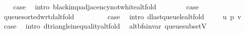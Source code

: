 \begin{isabellebody}
\ \ \isamarkupfalse%
\ {\isacharquery}{\kern0pt}case\ \isamarkupfalse%
\ {\isacharparenleft}{\kern0pt}intro\ black{\isacharunderscore}{\kern0pt}imp{\isacharunderscore}{\kern0pt}adjacency{\isacharunderscore}{\kern0pt}not{\isacharunderscore}{\kern0pt}white{\isacharunderscore}{\kern0pt}alt{\isacharunderscore}{\kern0pt}fold{\isacharparenright}{\kern0pt}\isanewline
{}\isamarkupfalse%
\isanewline
\ \ \isamarkupfalse%
\ {}{}\isanewline
\ \ \isamarkupfalse%
\ {\isacharquery}{\kern0pt}case\ \isamarkupfalse%
\ queue{\isacharunderscore}{\kern0pt}sorted{\isacharunderscore}{\kern0pt}wrt{\isacharunderscore}{\kern0pt}d{\isacharunderscore}{\kern0pt}alt{\isacharunderscore}{\kern0pt}fold\ \isacommand{{\isachardot}{\kern0pt}}\isamarkupfalse%
\isanewline
{}\isamarkupfalse%
\isanewline
\ \ \isamarkupfalse%
\ {}{}\isanewline
\ \ \isamarkupfalse%
\ {\isacharquery}{\kern0pt}case\ \isamarkupfalse%
\ {\isacharparenleft}{\kern0pt}intro\ d{\isacharunderscore}{\kern0pt}last{\isacharunderscore}{\kern0pt}queue{\isacharunderscore}{\kern0pt}le{\isacharunderscore}{\kern0pt}alt{\isacharunderscore}{\kern0pt}fold{\isacharparenright}{\kern0pt}\isanewline
{}\isamarkupfalse%
\isanewline
\ \ \isamarkupfalse%
\ {\isacharparenleft}{\kern0pt}{}{}\ u\ p\ v{\isacharparenright}{\kern0pt}\isanewline
\ \ \isamarkupfalse%
\ {\isacharquery}{\kern0pt}case\ \isamarkupfalse%
\ {\isacharparenleft}{\kern0pt}intro\ d{\isacharunderscore}{\kern0pt}triangle{\isacharunderscore}{\kern0pt}inequality{\isacharunderscore}{\kern0pt}alt{\isacharunderscore}{\kern0pt}fold{\isacharparenright}{\kern0pt}\isanewline
{}\isamarkupfalse%
%
\endisatagproof
{\isafoldproof}%
%
\isadelimproof
%
\endisadelimproof
%
\isadelimdocument
%
\endisadelimdocument
%
\isatagdocument
%
\isamarkuptrue%
%
\isamarkuptrue%
%
\endisatagdocument
{\isafolddocument}%
%
\isadelimdocument
%
\endisadelimdocument
{}\isamarkupfalse%
\ {\isacharparenleft}{\kern0pt}\ alt{\isacharunderscore}{\kern0pt}bfs{\isacharunderscore}{\kern0pt}invar{\isacharparenright}{\kern0pt}\ queue{\isacharunderscore}{\kern0pt}subset{\isacharunderscore}{\kern0pt}V{\isacharcolon}{\kern0pt}\isanewline

\end{isabellebody}
